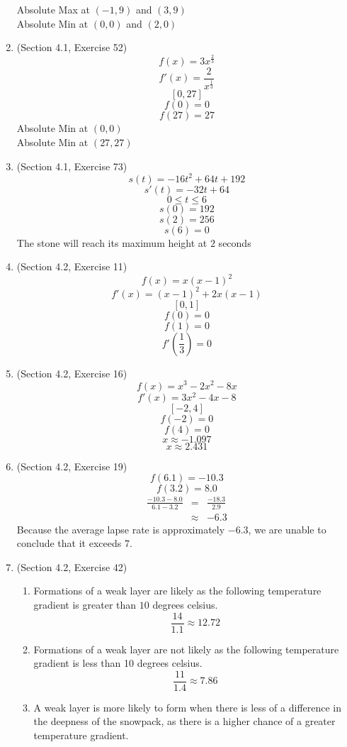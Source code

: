 \documentclass{article}
\begin{document}
\begin{enumerate}
        Absolute Max at $(-1, 9)$ and $(3, 9)$ \\
        Absolute Min at $(0, 0)$ and $(2, 0)$ \\
    \item (Section 4.1, Exercise 52)
        $$f(x) = 3x^{\frac{2}{3}}$$
        $$f'(x) = \frac{2}{x^{\frac{1}{3}}}$$
        $$[0, 27]$$
        $$f(0) = 0$$
        $$f(27) = 27$$
        Absolute Min at $(0, 0)$ \\
        Absolute Min at $(27, 27)$
    \item (Section 4.1, Exercise 73)
        $$s(t) = -16t^2 + 64t + 192$$
        $$s'(t) = -32t + 64$$
        $$0 \leq t \leq 6$$
        $$s(0) = 192$$
        $$s(2) = 256$$
        $$s(6) = 0$$
        The stone will reach its maximum height at $2$ seconds
    \item (Section 4.2, Exercise 11)
        $$f(x) = x\left(x - 1\right)^2$$
        $$f'(x) = \left(x - 1\right)^2 + 2x\left(x - 1\right)$$
        $$[0, 1]$$
        $$f(0) = 0$$
        $$f(1) = 0$$
        $$f'\left(\frac{1}{3}\right) = 0$$
    \item (Section 4.2, Exercise 16)
        $$f(x) = x^3 - 2x^2 - 8x$$
        $$f'(x) = 3x^2 - 4x - 8$$
        $$[-2, 4]$$
        $$f(-2) = 0$$
        $$f(4) = 0$$
        $$x \approx -1.097$$
        $$x \approx 2.431$$
    \item (Section 4.2, Exercise 19)
        $$f(6.1) = -10.3$$
        $$f(3.2) = 8.0$$
        \begin{eqnarray}
            \frac{-10.3 - 8.0}{6.1 - 3.2} &=& \frac{-18.3}{2.9} \\
                                          &\approx& -6.3
        \end{eqnarray}
        Because the average lapse rate is approximately $-6.3$, we are unable to conclude that it exceeds $7$.
    \item (Section 4.2, Exercise 42)
        \begin{enumerate}
            \item Formations of a weak layer are likely as the following temperature gradient is greater than $10$ degrees celsius.
                $$\frac{14}{1.1} \approx 12.72$$
            \item Formations of a weak layer are not likely as the following temperature gradient is less than 10 degrees celsius.
                $$\frac{11}{1.4} \approx 7.86$$
            \item A weak layer is more likely to form when there is less of a difference in the deepness of the snowpack, as there is a higher chance of a greater temperature gradient.

\end{enumerate}
\end{enumerate}
\end{document}
